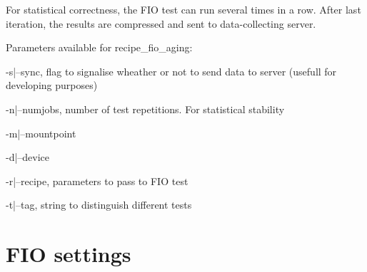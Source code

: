 \documentclass[
  color, %
  table, %
  lof,   %
  lot,   %
]{fithesis3}
\begin{document}
For statistical correctness, the FIO test can run several times in a row. After last iteration, the results are compressed and sent to data-collecting server.

Parameters available for recipe\_fio\_aging:
\begin{compactenum}
  \item -s|--sync, flag to signalise wheather or not to send data to server (usefull for developing purposes)
  \item -n|--numjobs, number of test repetitions. For statistical stability
  \item -m|--mountpoint
  \item -d|--device
  \item -r|--recipe, parameters to pass to FIO test
  \item -t|--tag, string to distinguish different tests
  \end{compactenum}

\section{FIO settings}




\end{document}
